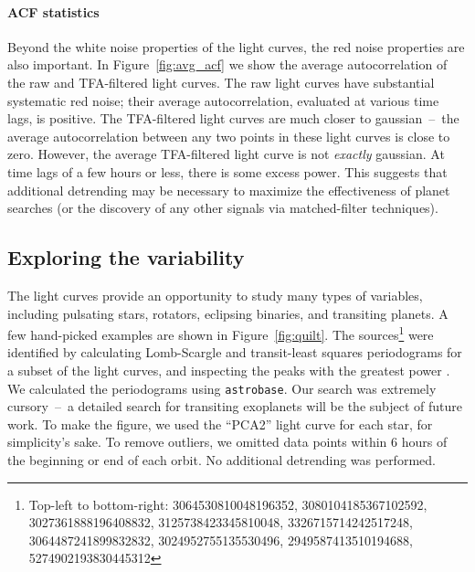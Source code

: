 \documentclass[12pt,twocolumn,tighten]{aastex62}
\begin{document}
\paragraph{ACF statistics}

Beyond the white noise properties of the light curves, the red noise
properties are also important. 
In Figure~\ref{fig:avg_acf} we show the average autocorrelation of the
raw and TFA-filtered light curves.
The raw light curves have substantial systematic red noise; 
their average autocorrelation, evaluated at various time lags, is
positive.
The TFA-filtered light curves are much closer to gaussian~--~the
average autocorrelation between any two points in these light curves
is close to zero.
However, the average TFA-filtered light curve is not {\it exactly}
gaussian.
At time lags of a few hours or less, there is some excess power.
This suggests that additional detrending may be
necessary to maximize the effectiveness of planet searches (or the discovery of
any other signals via matched-filter techniques).


\subsection{Exploring the variability}
\label{subsec:identifying_variability}

The light curves provide an opportunity to study many types of
variables, including pulsating stars, rotators, eclipsing binaries,
and transiting planets.
A few hand-picked examples are shown in Figure~\ref{fig:quilt}.
The sources\footnote{
	Top-left to bottom-right:
	3064530810048196352, 
	3080104185367102592, 
	3027361888196408832,
	3125738423345810048,
	3326715714242517248,
	3064487241899832832,
	3024952755135530496,
	2949587413510194688, 
	5274902193830445312 
} were identified by calculating Lomb-Scargle and transit-least
squares periodograms for a subset of the light curves, and inspecting
the peaks with the greatest power
\citep{lomb_1976,scargle_studies_1982,kovacs_box-fitting_2002,vanderplas_periodograms_2015,hippke_TLS_2019}.
We calculated the periodograms using
\texttt{astrobase}.
Our search was extremely cursory~--~a detailed search for transiting
exoplanets will be the subject of future work.
To make the figure, we used the ``PCA2'' light curve for each
star, for simplicity's sake.
To remove outliers, we omitted
data points within 6 hours of the beginning or end of each orbit.
No additional detrending was performed.
\end{document}
